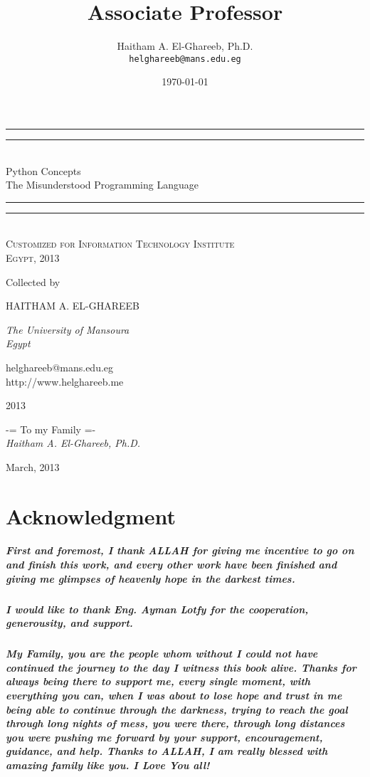 \documentclass[12pt,a4paper,final,twoside,onecolumn,titlepage]{book}
\author{Haitham A. El-Ghareeb, Ph.D. \\ \texttt{helghareeb@mans.edu.eg}}
\title{Associate Professor}
\date{\today}
\makeatletter
\newcommand*{\plogo}{\fbox{$\mathcal{PL}$}} %
\newcommand*{\titleGP}{\begingroup %
\centering %
\vspace*{\baselineskip} %

\rule{\textwidth}{1.6pt}\vspace*{-\baselineskip}\vspace*{2pt} %
\rule{\textwidth}{0.4pt}\\[\baselineskip] %

{\LARGE Python Concepts \\ The Misunderstood Programming Language}\\[0.2\baselineskip] %

\rule{\textwidth}{0.4pt}\vspace*{-\baselineskip}\vspace{3.2pt} %
\rule{\textwidth}{1.6pt}\\[\baselineskip] %

\scshape %
Customized for Information Technology Institute \\[\baselineskip] %
Egypt,  2013\par %

\vspace*{2\baselineskip} %

Collected by \\[\baselineskip]
{\Large HAITHAM A. EL-GHAREEB \par} %
{\itshape The University of Mansoura \\ Egypt\par} %

\vfill %

{\large helghareeb@mans.edu.eg \\ http://www.helghareeb.me}\par %
{\scshape 2013} \\[0.3\baselineskip] %

\endgroup}
\makeatother
\begin{document}
\frontmatter


\thispagestyle{empty}
\titleGP %


\cleardoublepage
\thispagestyle{empty}
\begin{center}
-= To my Family =- \\
\textit{Haitham A. El-Ghareeb, Ph.D.}
\end{center}

\begin{flushright}
March, 2013
\end{flushright}

\cleardoublepage
{}
\chapter{Acknowledgment}
\thispagestyle{empty}
\paragraph*{
First and foremost, I thank ALLAH for giving me incentive to go on and finish this work, and every other work have been finished and giving me glimpses of heavenly hope in the darkest times.}

\paragraph*{I would like to thank Eng. Ayman Lotfy for the cooperation, generousity, and support.}

\paragraph*{My Family, you are the people whom without I could not have continued the journey to the day I witness this book alive. Thanks for always being there to support me, every single moment, with everything you can, when I was about to lose hope and trust in me being able to continue through the darkness, trying to reach the goal through long nights of mess, you were there, through long distances you were pushing me forward by your support, encouragement, guidance, and help. Thanks to ALLAH, I am really blessed with amazing family like you. I Love You all!}
\end{document}
